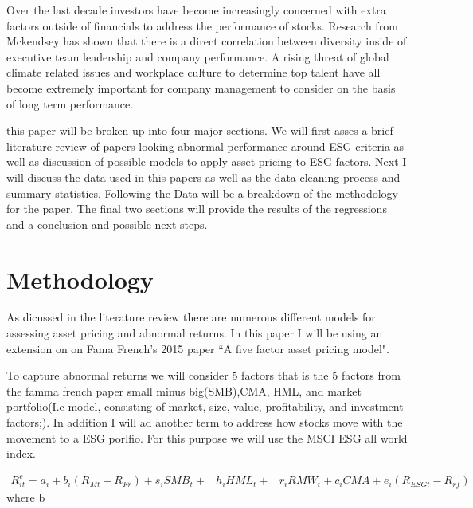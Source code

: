\documentclass[12pt,oneside,reqno]{amsart}
\begin{document}
Over the last decade investors have become increasingly concerned with extra factors outside of financials to address the performance of stocks. Research from Mckendsey has shown that there is a direct correlation between diversity inside of executive team leadership and company performance. A rising threat of global climate related issues and workplace culture to determine top talent have all become extremely important for company management to consider on the basis of long term performance.  


this paper will be broken up into four major sections. We will first asses a brief literature review of papers looking abnormal performance around ESG criteria as well as discussion of possible models to apply asset pricing to ESG factors. Next I will discuss the data used in this papers as well as the data cleaning process and summary statistics. Following the Data will be a breakdown of the methodology for the paper. The final two sections will provide the results of the regressions and a conclusion and possible next steps. 
\section{Methodology}
As dicussed in the literature review there are numerous different models for assessing asset pricing and abnormal returns. In this paper I will be using an extension on on Fama French's 2015 paper ``A five factor asset pricing model".

To capture abnormal returns we will consider 5 factors that is the 5 factors from the famma french paper small minus big(SMB),CMA, HML, and market portfolio(I.e model, consisting of market, size, value, profitability, and investment factors;). In addition I will ad another term to address how stocks move with the movement to a ESG porlfio. For this purpose we will use the MSCI ESG all world index. 

\begin{equation}
\begin{split}
    R_{it}^e = a_i+b_i(R_{Mt}-R_{Fr})+s_iSMB_t+ & h_iHML_t+ & r_iRMW_t+c_iCMA+e_i(R_{ESG t}-R_{rf})
    \end{split}
\end{equation}
where b
\end{document}
